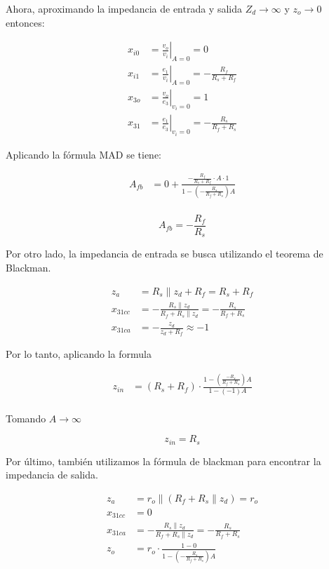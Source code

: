 Ahora, aproximando la impedancia de entrada y salida $Z_d \rightarrow \infty $ y $z_o \rightarrow 0$ entonces:

\begin{align}
x_{i0} &= \left. \frac{v_o}{v_i} \right|_{A=0} = 0 \\
x_{i1} &= \left. \frac{e_1}{v_i} \right|_{A=0} = -\frac{R_f}{R_s + R_f} \\
x_{3o} &= \left. \frac{v_o}{e_3} \right|_{v_i=0} = 1 \\
x_{31} &= \left. \frac{e_1}{e_3} \right|_{v_i=0} = -\frac{R_s}{R_f + R_s}
\end{align}

Aplicando la fórmula MAD se tiene: 

\begin{align}
A_{fb} &= 0 + \frac{-\frac{R_f}{R_s + R_f} \cdot A \cdot 1}{1 - \left( -\frac{R_s}{R_f + R_s} \right) A} \\
\end{align}

\begin{equation}
    \boxed{A_{fb} = -\frac{R_f}{R_s}}
\end{equation}


Por otro lado, la impedancia de entrada se busca utilizando el teorema de Blackman.

\begin{align}
z_a &= R_s \parallel z_d + R_f = R_s + R_f \\
x_{31cc} &= -\frac{R_s \parallel z_d}{R_f + R_s \parallel z_d} = -\frac{R_s}{R_f + R_s} \\
x_{31ca} &= -\frac{z_d}{z_d + R_f} \approx -1
\end{align}


Por lo tanto, aplicando la formula 

\begin{align}
z_{in} &= (R_s + R_f) \cdot \frac{1 - \left( \frac{-R_s}{R_f + R_s} \right) A}{1 - (-1)A} \\
\end{align}

Tomando $A \rightarrow \infty$ 

\begin{equation}
    \boxed{z_{in} = R_s}
\end{equation}

Por último, también utilizamos la fórmula de blackman para encontrar la impedancia de salida.

\begin{align}
z_a &= r_o \parallel (R_f + R_s \parallel z_d) = r_o \\
x_{31cc} &= 0 \\
x_{31ca} &= -\frac{R_s \parallel z_d}{R_f + R_s \parallel z_d} = -\frac{R_s}{R_f + R_s} \\
z_o &= r_o \cdot \frac{1 - 0}{1 - \left( -\frac{R_s}{R_f + R_s} \right) A} 
\end{align}

